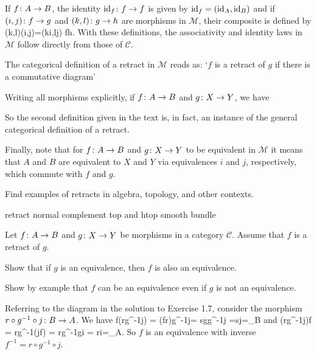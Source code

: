 If $f\colon A\to B$, the identity $\mathrm{id}_f\colon f\to f$ is given by $\mathrm{id}_f=(\mathrm{id}_A,\mathrm{id}_B)$ and if $(i,j)\colon f\to g$ and $(k,l)\colon g\to h$ are morphisms in $\mathcal{M}$, their composite is defined by
\bse
(k,l)\circ (i,j)=(k\circ i,l\circ j) \cl f\to h.
\ese
With these definitions, the associativity and identity laws in $\mathcal{M}$ follow directly from those of $\mathcal{C}$.

The categorical definition of a retract in $\mathcal{M}$ reads as: `$f$ is a retract of $g$ if there is a commutative diagram'
\bse
{}
\ese
Writing all morphisms explicitly, if $f\colon A\to B$ and $g\colon X\to Y$, we have
\bse
{}
\ese
So the second definition given in the text is, in fact, an instance of the general categorical definition of a retract.

Finally, note that for $f\colon A\to B$ and $g\colon X\to Y$ to be equivalent in $\mathcal{M}$ it means that $A$ and $B$ are equivalent to $X$ and $Y$ via equivalences $i$ and $j$, respectively, which commute with $f$ and $g$.
\es

\bx
Find examples of retracts in algebra, topology, and other contexts.
\ex

\bs
retract normal complement
top and htop
smooth bundle
\es

\bp
Let $f \colon A \to B$ and $g \colon X \to Y$ be morphisms in a category $\mathcal{C}$. Assume that $f$ is a retract of $g$.
\ben[label=(\alph*)]
\item Show that if $g$ is an equivalence, then $f$ is also an equivalence.
\item Show by example that $f$ can be an equivalence even if $g$ is not an equivalence.
\een
\ep

\bs
\ben[label=(\alph*)]
\item Referring to the diagram in the solution to Exercise 1.7, consider the morphism $r\circ g^{-1}\circ j\colon B\to A$. We have
\bse
f\circ (r\circ g^{-1}\circ j) = (f\circ r)\circ g^{-1}\circ j= s\circ g\circ g^{-1}\circ j =s\circ j=\id_B
\ese
and
\bse
(r\circ g^{-1}\circ j)\circ f = r\circ g^{-1}\circ (j\circ f) = r\circ g^{-1}\circ g\circ i = r\circ i=\id_A.
\ese
So $f$ is an equivalence with inverse $f^{-1}=r\circ g^{-1}\circ j$.
\item
\een
\es

